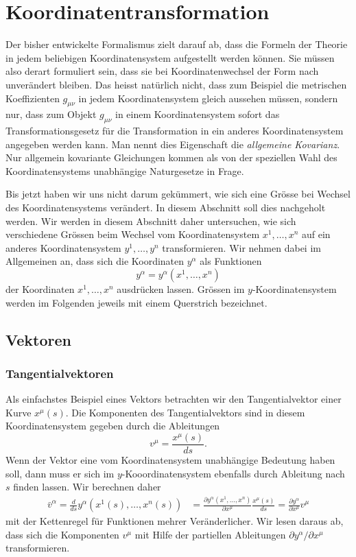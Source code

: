 %
%
%
\section{Koordinatentransformation}
Der bisher entwickelte Formalismus zielt darauf ab, dass die Formeln der
Theorie in jedem beliebigen Koordinatensystem aufgestellt werden können.
Sie müssen also derart formuliert sein, dass sie bei Koordinatenwechsel
der Form nach unverändert bleiben.
Das heisst natürlich nicht, dass zum Beispiel die metrischen Koeffizienten
$g_{\mu\nu}$ in jedem Koordinatensystem gleich aussehen müssen, sondern
nur, dass zum Objekt $g_{\mu\nu}$ in einem Koordinatensystem sofort
das Transformationsgesetz für die Transformation in ein anderes
Koordinatensystem angegeben werden kann.
Man nennt dies Eigenschaft die {\em allgemeine Kovarianz}.
Nur allgemein kovariante Gleichungen kommen als von der speziellen
Wahl des Koordinatensystems unabhängige Naturgesetze in Frage.

Bis jetzt haben wir uns nicht darum gekümmert, wie sich eine Grösse
bei Wechsel des Koordinatensystems verändert.
In diesem Abschnitt soll dies nachgeholt werden.
Wir werden in diesem Abschnitt daher untersuchen, wie sich verschiedene
Grössen beim Wechsel vom Koordinatensystem $x^1,\dots,x^n$ auf ein
anderes Koordinatensystem $y^1,\dots,y^n$ transformieren.
Wir nehmen dabei im Allgemeinen an, dass sich die Koordinaten $y^\alpha$
als Funktionen
\[
y^\alpha = y^\alpha(x^1,\dots,x^n)
\]
der Koordinaten $x^1,\dots,x^n$ ausdrücken lassen.
Grössen im $y$-Koordinatensystem werden im Folgenden jeweils mit
einem Querstrich bezeichnet.

\subsection{Vektoren}

\subsubsection{Tangentialvektoren}
Als einfachstes Beispiel eines Vektors betrachten wir den Tangentialvektor
einer Kurve $x^\mu(s)$.
Die Komponenten des Tangentialvektors sind in diesem Koordinatensystem
gegeben durch die Ableitungen
\[
v^\mu
=
\frac{x^\mu(s)}{ds}.
\]
Wenn der Vektor eine vom Koordinatensystem unabhängige Bedeutung haben soll,
dann muss er sich im $y$-Kooordinatensystem ebenfalls durch Ableitung nach
$s$ finden lassen.
Wir berechnen daher 
\begin{align}
\bar v^\alpha
=
\frac{d}{ds}y^\alpha(x^1(s),\dots,x^n(s))
&=
\frac{\partial y^\alpha(x^1,\dots,x^n)}{\partial x^\mu}\frac{x^\mu(s)}{ds}
=
\frac{\partial y^\alpha}{\partial x^\mu} v^\mu
\label{skript:trafo:kontra}
\end{align}
mit der Kettenregel für Funktionen mehrer Veränderlicher.
Wir lesen daraus ab, dass sich die Komponenten $v^\mu$ mit Hilfe der
partiellen Ableitungen $\partial y^\alpha/\partial x^\mu$ transformieren.

